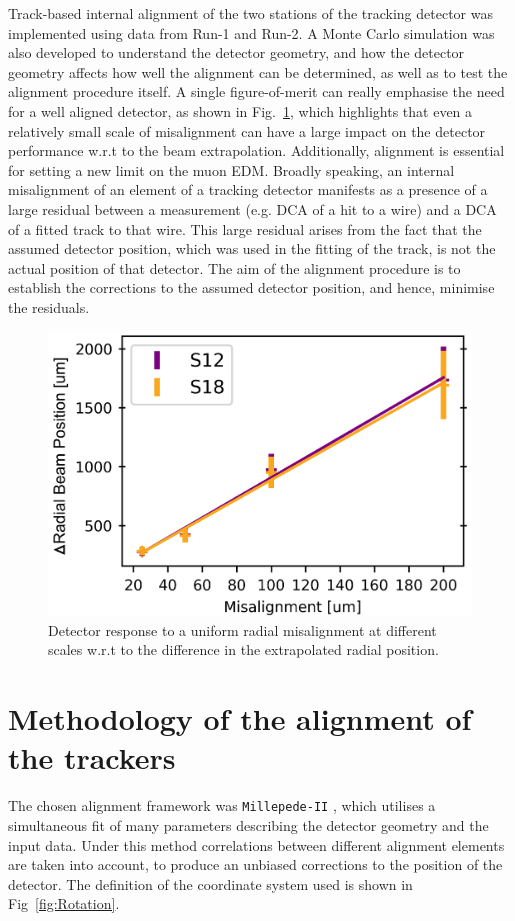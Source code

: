 \documentclass[12pt]{article}
\begin{document}
Track-based internal alignment of the two stations of the tracking detector was implemented using data from Run-1 and Run-2. A Monte Carlo simulation was also developed to understand the detector geometry, and how the detector geometry affects how well the alignment can be determined, as well as to test the alignment procedure itself. A single figure-of-merit can really emphasise the need for a well aligned detector, as shown in Fig.~\ref{fig:rad_inter}, which highlights that even a relatively small scale of misalignment can have a large impact on the detector performance w.r.t to the beam extrapolation. Additionally, alignment is essential for setting a new limit on the muon EDM. Broadly speaking, an internal misalignment of an element of a tracking detector manifests as a presence of a large residual between a measurement (e.g. DCA of a hit to a wire) and a DCA of a fitted track to that wire. This large residual arises from the fact that the assumed detector position, which was used in the fitting of the track, is not the actual position of that detector. The aim of the alignment procedure is to establish the corrections to the assumed detector position, and hence, minimise the residuals.

\begin{figure}[h!]
\centering
\includegraphics[width=0.6\linewidth]{fig/internal_rad.png}
\caption{Detector response to a uniform radial misalignment at different scales w.r.t to the difference in the extrapolated radial position.}
\label{fig:rad_inter}
\end{figure}

\section{Methodology of the alignment of the trackers}
The chosen alignment framework was \texttt{Millepede-II} \cite{mp2}, which utilises a simultaneous fit of many parameters describing the detector geometry and the input data. Under this method correlations between different alignment elements are taken into account, to produce an unbiased corrections to the position of the detector. The definition of the coordinate system used is shown in Fig~\ref{fig:Rotation}.
\end{document}
